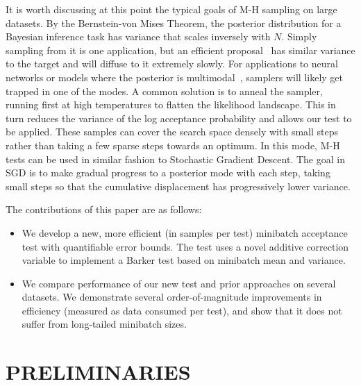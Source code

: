 \documentclass[letterpaper]{article}
\begin{document}
It is worth discussing at this point the typical goals of M-H sampling on large
datasets. By the Bernstein-von Mises Theorem, the posterior distribution for a
Bayesian inference task has variance that scales inversely with $N$. Simply
sampling from it is one application, but an efficient
proposal~\citep{OptimalScaling01} has similar variance to the target and will
diffuse to it extremely slowly. For applications to neural networks or models
where the posterior is multimodal~\citep{choromanska2014loss}, samplers will
likely get trapped in one of the modes. A common solution is to anneal the
sampler, running first at high temperatures to flatten the likelihood landscape.
This in turn reduces the variance of the log acceptance probability and allows
our test to be applied. These samples can cover the search space densely with
small steps rather than taking a few sparse steps towards an optimum. In this
mode, M-H tests can be used in similar fashion to Stochastic Gradient Descent.
The goal in SGD is to make gradual progress to a posterior mode with each step,
taking small steps so that the cumulative displacement has progressively lower
variance.

The contributions of this paper are as follows:

\begin{itemize}[noitemsep]
    \item We develop a new, more efficient (in samples per test) minibatch
    acceptance test with quantifiable error bounds. The test uses a novel
    additive correction variable to implement a Barker test based on minibatch
    mean and variance. 

    \item We compare performance of our new test and prior approaches on several
    datasets. We demonstrate several order-of-magnitude improvements in efficiency
    (measured as data consumed per test), and show that it does not suffer from
    long-tailed minibatch sizes.
\end{itemize}




\section{PRELIMINARIES}\label{sec:related_work}
\end{document}
